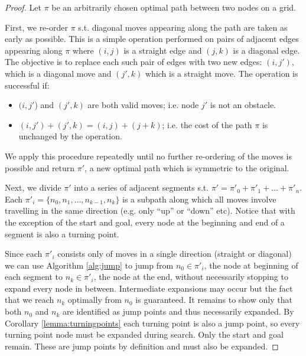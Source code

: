 \begin{proof}
Let $\pi$ be an arbitrarily chosen optimal path between two nodes
on a grid.  
\par
First, we re-order $\pi$ s.t. diagonal moves appearing along the path are taken
as early as possible. This is a simple operation performed on pairs of adjacent
edges appearing along $\pi$ where $(i, j)$ is a straight edge and $(j, k)$ is a
diagonal edge.
The objective is to replace each such pair of edges with two new edges: 
$(i, j')$, which is a diagonal move and $(j', k)$ which is a straight move. 
The operation is successful if:
\begin{itemize}
\item $(i, j'$) and $(j', k)$ are both valid moves; i.e. node $j'$ is not an
obstacle.
\item $(i, j') + (j', k) = (i, j) + (j + k)$; i.e. the cost of
the path $\pi$ is unchanged by the operation.
\end{itemize}
We apply this procedure repeatedly until no further re-ordering of the moves
is possible and return $\pi'$, a new optimal path which is symmetric
to the original.
\par
Next, we divide $\pi'$ into a series of adjacent segments s.t. 
$\pi' = \pi'_{0} + \pi'_{1} + \ldots + \pi'_{n} $. Each $\pi'_{i} = \lbrace n_{0}, n_{1},
\ldots, n_{k-1}, n_{k} \rbrace$ is a subpath along which all moves involve
travelling in the same direction (e.g.  only ``up'' or ``down'' etc).  Notice
that with the exception of the start and goal, every node at the beginning and
end of a segment is also a turning point.
\par
Since each $\pi'_{i}$ consists only of moves in a single direction
(straight or diagonal) we can use Algorithm \ref{alg:jump} to jump from $n_{0}
\in \pi'_{i}$, the node at beginning of each segment to $n_{k} \in \pi'_{i}$, the
node at the end, without necessarily stopping to expand every node in between.
Intermediate expansions may occur but the fact that we reach $n_{k}$
optimally from $n_{0}$ is guaranteed.
It remains to show only that both $n_{0}$ and $n_{k}$ are identified as
jump points and thus necessarily expanded. 
By Corollary \ref{lemma:turningpoints} each turning point is 
also a jump point, so every turning point node must be expanded during search.
Only the start and goal remain. These are jump points by definition and must
also be expanded.
\end{proof}

